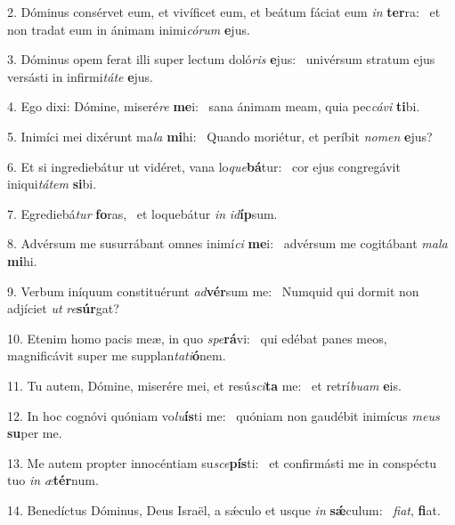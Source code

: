 2. Dóminus consérvet eum, et vivíficet eum, et beátum fáciat eum \textit{in} \textbf{ter}ra: \ast\  et non tradat eum in ánimam inimi\textit{có}\textit{rum} \textbf{e}jus.\

3. Dóminus opem ferat illi super lectum doló\textit{ris} \textbf{e}jus: \ast\  univérsum stratum ejus versásti in infirmi\textit{tá}\textit{te} \textbf{e}jus.\

4. Ego dixi: Dómine, miseré\textit{re} \textbf{me}i: \ast\  sana ánimam meam, quia pec\textit{cá}\textit{vi} \textbf{ti}bi.\

5. Inimíci mei dixérunt ma\textit{la} \textbf{mi}hi: \ast\  Quando moriétur, et períbit \textit{no}\textit{men} \textbf{e}jus?\

6. Et si ingrediebátur ut vidéret, vana lo\textit{que}\textbf{bá}tur: \ast\  cor ejus congregávit iniqui\textit{tá}\textit{tem} \textbf{si}bi.\

7. Egrediebá\textit{tur} \textbf{fo}ras, \ast\  et loquebátur \textit{in} \textit{id}\textbf{íp}sum.\

8. Advérsum me susurrábant omnes inimí\textit{ci} \textbf{me}i: \ast\  advérsum me cogitábant \textit{ma}\textit{la} \textbf{mi}hi.\

9. Verbum iníquum constituérunt \textit{ad}\textbf{vér}sum me: \ast\  Numquid qui dormit non adjíciet \textit{ut} \textit{re}\textbf{súr}gat?\

10. Etenim homo pacis meæ, in quo \textit{spe}\textbf{rá}vi: \ast\  qui edébat panes meos, magnificávit super me supplan\textit{ta}\textit{ti}\textbf{ó}nem.\

11. Tu autem, Dómine, miserére mei, et resú\textit{sci}\textbf{ta} me: \ast\  et retrí\textit{bu}\textit{am} \textbf{e}is.\

12. In hoc cognóvi quóniam vo\textit{lu}\textbf{ís}ti me: \ast\  quóniam non gaudébit inimícus \textit{me}\textit{us} \textbf{su}per me.\

13. Me autem propter innocéntiam su\textit{sce}\textbf{pís}ti: \ast\  et confirmásti me in conspéctu tuo \textit{in} \textit{æ}\textbf{tér}num.\

14. Benedíctus Dóminus, Deus Israël, a sǽculo et usque \textit{in} \textbf{sǽ}culum: \ast\  \textit{fi}\textit{at}, \textbf{fi}at.\

